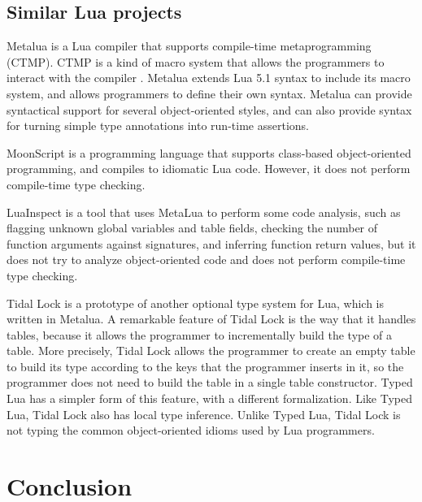 \documentclass[preprint]{sig-alternate}
\begin{document}
\subsection{Similar Lua projects}

Metalua \citep{metalua} is a Lua compiler that supports compile-time
metaprogramming (CTMP).
CTMP is a kind of macro system that allows the programmers to interact
with the compiler \citep{fleutot2007contrasting}. 
Metalua extends Lua 5.1 syntax to include its macro system,
and allows programmers to define their own syntax.
Metalua can provide syntactical support for several object-oriented
styles, and can also provide syntax for turning simple type
annotations into run-time assertions.

MoonScript \citep{moonscript} is a programming language that supports
class-based object-oriented programming, and compiles to idiomatic
Lua code.
However, it does not perform compile-time type checking.

LuaInspect \citep{luainspect} is a tool that uses MetaLua to perform
some code analysis, such as flagging unknown global variables and
table fields, checking the number of function arguments against
signatures, and inferring function return values, but it does not
try to analyze object-oriented code and does not perform compile-time
type checking.

Tidal Lock \citep{tidallock} is a prototype of another optional type
system for Lua, which is written in Metalua.
A remarkable feature of Tidal Lock is the way that it handles tables,
because it allows the programmer to incrementally build the type of
a table.
More precisely, Tidal Lock allows the programmer to create an empty
table to build its type according to the keys that the programmer
inserts in it, so the programmer does not need to build the table in
a single table constructor.
Typed Lua has a simpler form of this feature, with a different
formalization.
Like Typed Lua, Tidal Lock also has local type inference.
Unlike Typed Lua, Tidal Lock is not typing the common object-oriented
idioms used by Lua programmers.

\section{Conclusion} \label{sec:con}



\end{document}
